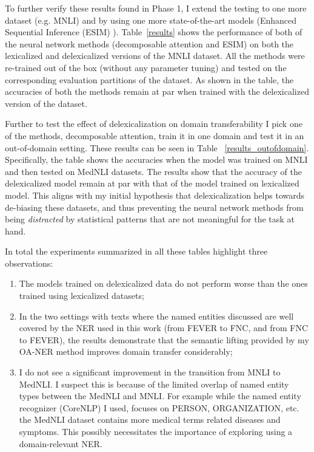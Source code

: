 \documentclass{article}
\begin{document}
To further verify these results found in Phase 1, I extend the testing to one more dataset (e.g. MNLI) and by using one more state-of-the-art models (Enhanced Sequential Inference (ESIM)  \cite{chen2016enhanced}). Table~\ref{results} shows the performance of both of the neural network methods (decomposable attention and ESIM) on  both the lexicalized and delexicalized versions of the MNLI dataset. All the methods were re-trained out of the box (without any parameter tuning) and tested on the corresponding evaluation partitions of the dataset. As shown in the table, the accuracies of both the methods remain at par when trained with the delexicalized version of the dataset. 


 
Further to test the effect of delexicalization on domain transferability I pick one of the methods, decomposable attention, train it in one domain and test it in an out-of-domain setting. These results can be seen in Table ~\ref{results_outofdomain}. Specifically, the table shows the accuracies when the model was trained on MNLI and then tested on MedNLI datasets. The results show that the accuracy of the delexicalized model remain at par with that of the model trained on lexicalized model. This aligns with my initial hypothesis that delexicalization helps towards de-biasing these datasets, and thus preventing the neural network methods from being \textit{distracted} by statistical patterns that are not meaningful for the task at hand.

In total the experiments summarized in all these tables highlight three observations: 

\begin {enumerate}
\item The models trained on delexicalized data do not perform worse than the ones trained using lexicalized datasets; 
\item In the two settings with texts where the named entities discussed are well covered by the NER used in this work (from FEVER to FNC, and from FNC to FEVER), the results demonstrate that the semantic lifting provided by my OA-NER method improves domain transfer considerably;  

\item I do not see a significant improvement in the transition from MNLI to MedNLI.  I suspect this is because of the limited overlap of named entity types between the MedNLI and MNLI. For example while the named entity recognizer (CoreNLP) I used, focuses on PERSON, ORGANIZATION, etc. the MedNLI dataset contains more medical terms related diseases and symptoms. This possibly necessitates the importance of exploring using a domain-relevant NER.

\end {enumerate}
\end{document}
